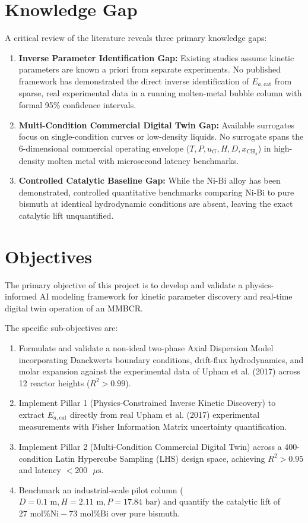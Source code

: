 \documentclass[12pt,a4paper,oneside]{report}
\begin{document}
\chapter{Knowledge Gap}
A critical review of the literature reveals three primary knowledge gaps:
\begin{enumerate}
    \item \textbf{Inverse Parameter Identification Gap:} Existing studies assume kinetic parameters are known a priori from separate experiments. No published framework has demonstrated the direct inverse identification of $E_{a,\text{cat}}$ from sparse, real experimental data in a running molten-metal bubble column with formal 95\% confidence intervals.
    \item \textbf{Multi-Condition Commercial Digital Twin Gap:} Available surrogates focus on single-condition curves or low-density liquids. No surrogate spans the 6-dimensional commercial operating envelope ($T, P, u_G, H, D, x_{\text{CH}_4}$) in high-density molten metal with microsecond latency benchmarks.
    \item \textbf{Controlled Catalytic Baseline Gap:} While the Ni-Bi alloy has been demonstrated, controlled quantitative benchmarks comparing Ni-Bi to pure bismuth at identical hydrodynamic conditions are absent, leaving the exact catalytic lift unquantified.
\end{enumerate}

\chapter{Objectives}
The primary objective of this project is to develop and validate a physics-informed AI modeling framework for kinetic parameter discovery and real-time digital twin operation of an MMBCR.

The specific sub-objectives are:
\begin{enumerate}
    \item Formulate and validate a non-ideal two-phase Axial Dispersion Model incorporating Danckwerts boundary conditions, drift-flux hydrodynamics, and molar expansion against the experimental data of Upham et al. (2017) across 12 reactor heights ($R^2 > 0.99$).
    \item Implement Pillar 1 (Physics-Constrained Inverse Kinetic Discovery) to extract $E_{a,\text{cat}}$ directly from real Upham et al. (2017) experimental measurements with Fisher Information Matrix uncertainty quantification.
    \item Implement Pillar 2 (Multi-Condition Commercial Digital Twin) across a 400-condition Latin Hypercube Sampling (LHS) design space, achieving $R^2 > 0.95$ and latency $< 200\text{ }\mu\text{s}$.
    \item Benchmark an industrial-scale pilot column ($D = 0.1\text{ m}, H = 2.11\text{ m}, P = 17.84\text{ bar}$) and quantify the catalytic lift of $27\text{ mol\% Ni}-73\text{ mol\% Bi}$ over pure bismuth.
\end{enumerate}
\end{document}
